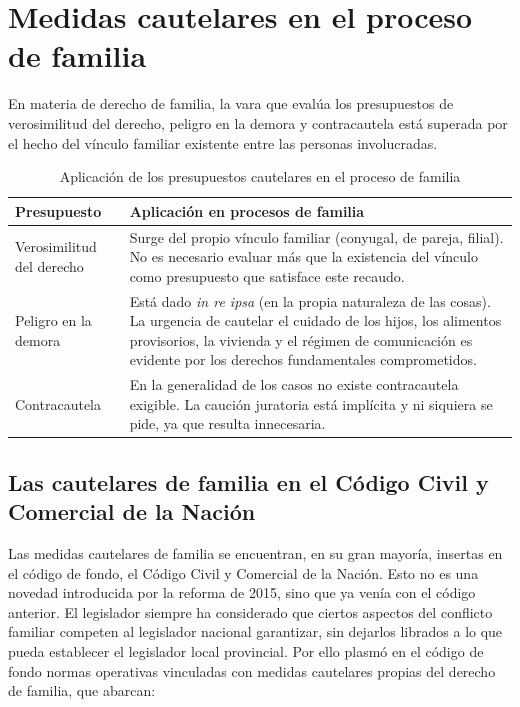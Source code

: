 \documentclass[12pt,oneside]{book}
\begin{document}
\section{Medidas cautelares en el proceso de familia}

En materia de derecho de familia, la vara que evalúa los presupuestos de verosimilitud del derecho, peligro en la demora y contracautela está superada por el hecho del vínculo familiar existente entre las personas involucradas.

\begin{table}[H]
\centering
\caption{Aplicación de los presupuestos cautelares en el proceso de familia}
\begin{tabularx}{\textwidth}{l X}
\toprule
\textbf{Presupuesto} & \textbf{Aplicación en procesos de familia} \\
\midrule
Verosimilitud del derecho & Surge del propio vínculo familiar (conyugal, de pareja, filial). No es necesario evaluar más que la existencia del vínculo como presupuesto que satisface este recaudo. \\
\addlinespace
Peligro en la demora & Está dado \textit{in re ipsa} (en la propia naturaleza de las cosas). La urgencia de cautelar el cuidado de los hijos, los alimentos provisorios, la vivienda y el régimen de comunicación es evidente por los derechos fundamentales comprometidos. \\
\addlinespace
Contracautela & En la generalidad de los casos no existe contracautela exigible. La caución juratoria está implícita y ni siquiera se pide, ya que resulta innecesaria. \\
\bottomrule
\end{tabularx}
\end{table}

\subsection{Las cautelares de familia en el Código Civil y Comercial de la Nación}

Las medidas cautelares de familia se encuentran, en su gran mayoría, insertas en el código de fondo, el Código Civil y Comercial de la Nación. Esto no es una novedad introducida por la reforma de 2015, sino que ya venía con el código anterior. El legislador siempre ha considerado que ciertos aspectos del conflicto familiar competen al legislador nacional garantizar, sin dejarlos librados a lo que pueda establecer el legislador local provincial. Por ello plasmó en el código de fondo normas operativas vinculadas con medidas cautelares propias del derecho de familia, que abarcan:
\end{document}
